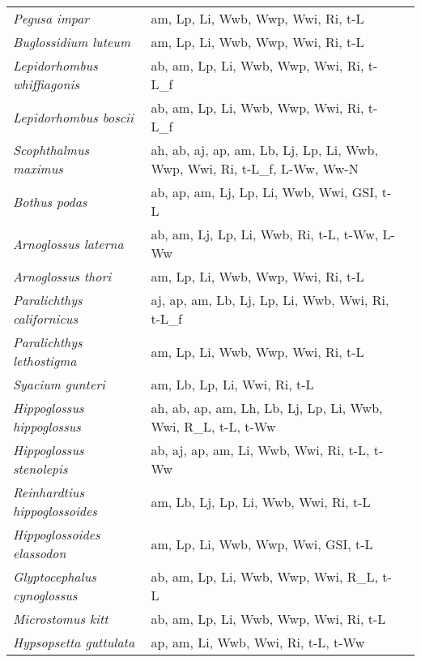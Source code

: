 {\begin{longtable}[c]{p{3.5cm}p{5.5cm}p{5.5cm}}
\emph{Pegusa impar} &  am, Lp, Li, Wwb, Wwp, Wwi, Ri, t-L & \citet{Deni1990} \\
\emph{Buglossidium luteum} &  am, Lp, Li, Wwb, Wwp, Wwi, Ri, t-L & \citet{Deni1990,CastEdwa2017} \\
\emph{Lepidorhombus whiffiagonis} &  ab, am, Lp, Li, Wwb, Wwp, Wwi, Ri, t-L\_f & \citet{LandPifi1996} \\
\emph{Lepidorhombus boscii} &  ab, am, Lp, Li, Wwb, Wwp, Wwi, Ri, t-L\_f & \citet{Sant1995,LandPere2002} \\
\emph{Scophthalmus maximus} &  ah, ab, aj, ap, am, Lb, Lj, Lp, Li, Wwb, Wwp, Wwi, Ri, t-L\_f, L-Ww, Ww-N & \citet{Jone1972,Jone1973,Jone1974,Hamm2011} \\
\emph{Bothus podas} &  ab, ap, am, Lj, Lp, Li, Wwb, Wwi, GSI, t-L & \citet{MoraAfon2007} \\
\emph{Arnoglossus laterna} &  ab, am, Lj, Lp, Li, Wwb, Ri, t-L, t-Ww, L-Ww & \citet{CastEdwa2017,TiciMati2012,GibsEzzi1980} \\
\emph{Arnoglossus thori} &  am, Lp, Li, Wwb, Wwp, Wwi, Ri, t-L & \citet{Deni1990} \\
\emph{Paralichthys californicus} &  aj, ap, am, Lb, Lj, Lp, Li, Wwb, Wwi, Ri, t-L\_f & \citet{MacNDome2001} \\
\emph{Paralichthys lethostigma} &  am, Lp, Li, Wwb, Wwp, Wwi, Ri, t-L &  \\
\emph{Syacium gunteri} &  am, Lb, Lp, Li, Wwi, Ri, t-L & \citet{SancFlore2006} \\
\emph{Hippoglossus hippoglossus} &  ah, ab, ap, am, Lh, Lb, Lj, Lp, Li, Wwb, Wwi, R\_L, t-L, t-Ww & \citet{LonnKjor1982,BlaxDani1983,WienJoha2011,MunkNiel2005,JakuHaug1988,LeinHolm1997,HaugGull1988,Andr1964} \\
\emph{Hippoglossus stenolepis} &  ab, aj, ap, am, Li, Wwb, Wwi, Ri, t-L, t-Ww & \citet{McFaJens1991,OrloKutn2011} \\
\emph{Reinhardtius hippoglossoides} &  am, Lb, Lj, Lp, Li, Wwb, Wwi, Ri, t-L & \citet{DwyeTreb2016} \\
\emph{Hippoglossoides elassodon} &  am, Lp, Li, Wwb, Wwp, Wwi, GSI, t-L & \citet{Stra2004,Forr1964} \\
\emph{Glyptocephalus cynoglossus} &  ab, am, Lp, Li, Wwb, Wwp, Wwi, R\_L, t-L & \citet{Bage1963,Magn2007} \\
\emph{Microstomus kitt} &  ab, am, Lp, Li, Wwb, Wwp, Wwi, Ri, t-L & \citet{Magn2007} \\
\emph{Hypsopsetta guttulata} &  ap, am, Li, Wwb, Wwi, Ri, t-L, t-Ww &  \\

\end{longtable}}
